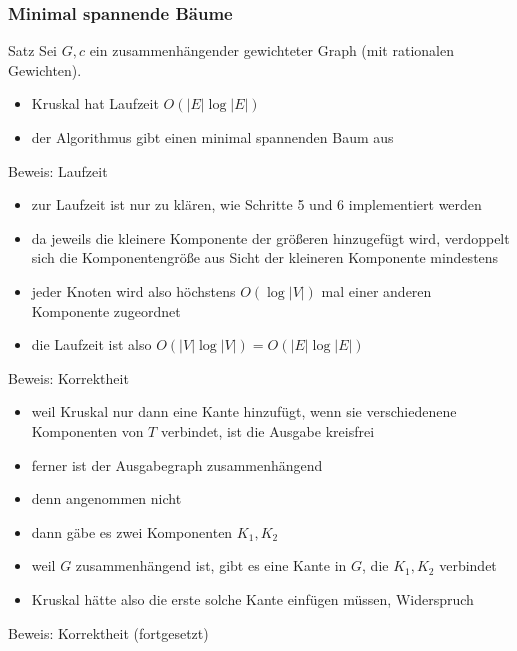 \documentclass[aspectratio=1610, 11pt]{beamer}
\newcommand{\mytitle}{Minimal spannende B\"aume}
\begin{document}
\begin{frame}\frametitle{\mytitle}
	\begin{overprint}
		\begin{block}{Satz}
			Sei $G,c$ ein zusammenh\"angender gewichteter Graph (mit rationalen Gewichten).
			\begin{itemize}
				\item Kruskal hat Laufzeit $O(|E|\log|E|)$
				\item der Algorithmus gibt einen minimal spannenden Baum aus
			\end{itemize}
		\end{block}
		\begin{exampleblock}{Beweis: Laufzeit}
			\begin{itemize}
				\item zur Laufzeit ist nur zu kl\"aren, wie Schritte 5 und 6 implementiert werden
				\item da jeweils die kleinere Komponente der gr\"o\ss eren hinzugef\"ugt wird, verdoppelt sich die Komponentengr\"o\ss e aus Sicht der kleineren Komponente mindestens
				\item jeder Knoten wird also h\"ochstens $O(\log|V|)$ mal einer anderen Komponente zugeordnet
				\item die Laufzeit ist also $O(|V|\log|V|)=O(|E|\log|E|)$
			\end{itemize}
		\end{exampleblock}
		\begin{exampleblock}{Beweis: Korrektheit}
			\begin{itemize}
				\item weil Kruskal nur dann eine Kante hinzuf\"ugt, wenn sie verschiedenene Komponenten von $T$ verbindet, ist die Ausgabe kreisfrei
				\item ferner ist der Ausgabegraph zusammenh\"angend
				\item denn angenommen nicht
				\item dann g\"abe es zwei Komponenten $K_1,K_2$
				\item weil $G$ zusammenh\"angend ist, gibt es eine Kante in $G$, die $K_1,K_2$ verbindet
				\item Kruskal h\"atte also die erste solche Kante einf\"ugen m\"ussen, Widerspruch
			\end{itemize}
		\end{exampleblock}
		\begin{exampleblock}{Beweis: Korrektheit (fortgesetzt)}
			\begin{itemize}

\end{itemize}
\end{exampleblock}
\end{overprint}
\end{frame}
\end{document}
